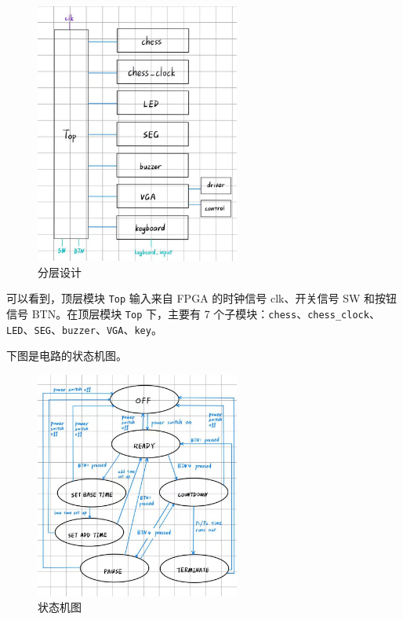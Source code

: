\documentclass[a4paper, 12pt]{article}
\begin{document}
        \begin{figure}[H]
            \centering
            \includegraphics[width=0.6\textwidth]{hierarchical_design.jpg}
            \caption{分层设计}
        \end{figure}

        可以看到，顶层模块 \texttt{Top} 输入来自 FPGA 的时钟信号 clk、开关信号 SW 和按钮信号 BTN。在顶层模块 \texttt{Top} 下，主要有 7 个子模块：\texttt{chess}、\texttt{chess\_clock}、\texttt{LED}、\texttt{SEG}、\texttt{buzzer}、\texttt{VGA}、\texttt{key}。

        下图是电路的状态机图。

        \begin{figure}[H]
            \centering
            \includegraphics[width=0.6\textwidth]{statemachine_chart.jpg}
            \caption{状态机图}
        \end{figure}
\end{document}
